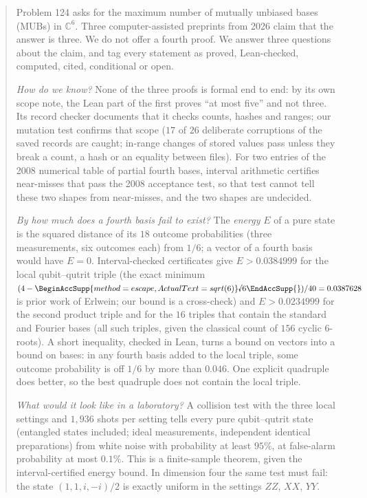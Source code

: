 \documentclass[11pt]{article}
\newcommand{\rnum}[1]{\BeginAccSupp{method=escape,ActualText=sqrt(#1)}\text{\textsurd}#1\EndAccSupp{}}
\newcommand{\rsix}{\rnum{6}}
\newcommand{\C}{\mathbb{C}}
\newcommand{\E}{E}                       %
\theoremstyle{definition}
\theoremstyle{remark}
\begin{document}
\begin{abstract}
\noindent
Problem 124 asks for the maximum number of mutually unbiased bases (MUBs) in $\C^6$. Three computer-assisted
preprints from 2026 claim that the answer is three. We do not offer a fourth proof. We answer three questions about
the claim, and tag every statement as proved, Lean-checked, computed, cited, conditional or open.

\emph{How do we know?} None of the three proofs is formal end to end: by its own scope note, the Lean part of the
first proves ``at most five'' and not three. Its record checker documents that it checks counts, hashes and ranges;
our mutation test confirms that scope ($17$ of $26$ deliberate corruptions of the saved records are caught;
in-range changes of stored values pass unless they break a count, a hash or an equality between files). For two entries of the 2008 numerical table of partial fourth
bases, interval arithmetic certifies near-misses that pass the 2008 acceptance test, so that test cannot tell
these two shapes from near-misses, and the two shapes are undecided.

\emph{By how much does a fourth basis fail to exist?} The \emph{energy} $\E$ of a pure state is the squared
distance of its $18$ outcome probabilities (three measurements, six outcomes each) from $1/6$; a vector of a fourth
basis would have $\E=0$. Interval-checked certificates give $\E>0.0384999$ for the local qubit--qutrit triple (the
exact minimum $(4-\rsix)/40=0.0387628$ is prior work of Erlwein; our bound is a cross-check) and $\E>0.0234999$
for the second product triple and for the $16$ triples that contain the standard and Fourier bases (all such triples, given the classical count of $156$ cyclic $6$-roots). A short
inequality, checked in Lean, turns a bound on vectors into a bound on bases: in any fourth basis added to the local
triple, some outcome probability is off $1/6$ by more than $0.046$. One explicit quadruple does better, so the
best quadruple does not contain the local triple.

\emph{What would it look like in a laboratory?} A collision test with the three local settings and $1{,}936$ shots
per setting tells every pure qubit--qutrit state (entangled states included; ideal measurements, independent
identical preparations) from white noise with probability at least $95\%$, at false-alarm probability at most
$0.1\%$. This is a finite-sample theorem, given the interval-certified energy bound. In dimension four the same test must fail: the state $(1,1,i,-i)/2$ is
exactly uniform in the settings $ZZ$, $XX$, $YY$.
\end{abstract}
\end{document}
